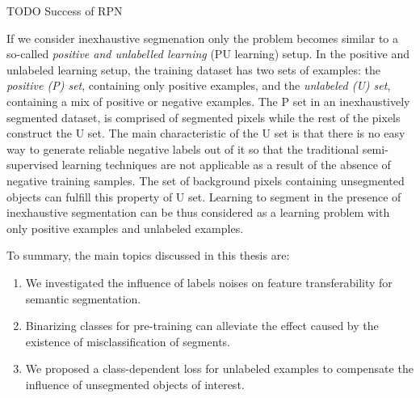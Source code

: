 {TODO}
Success of RPN


If we consider inexhaustive segmenation only the problem becomes similar to a so-called \textit{positive and unlabelled learning} (PU learning) setup\cite{li2005learning}.
In the positive and unlabeled learning setup, the training dataset has two sets of examples: the \textit{positive (P) set}, containing only positive examples, and the \textit{unlabeled (U) set}, containing a mix of positive or negative examples.
The P set in an inexhaustively segmented dataset, is comprised of segmented pixels while the rest of the pixels construct the U set.
The main characteristic of the U set is that there is no easy way to generate reliable negative labels out of it so that the traditional semi-supervised learning techniques are not applicable as a result of the absence of negative training samples.
The set of background pixels containing unsegmented objects can fulfill this property of U set.
Learning to segment in the presence of inexhaustive segmentation can be thus considered as a learning problem with only positive examples and unlabeled examples.



To summary, the main topics discussed in this thesis are:
\begin{enumerate}
  \item We investigated the influence of labels noises on feature transferability for semantic segmentation.
  \item Binarizing classes for pre-training can alleviate the effect caused by the existence of misclassification of segments.
  \item We proposed a class-dependent loss for unlabeled examples to compensate the influence of unsegmented objects of interest.
\end{enumerate}



